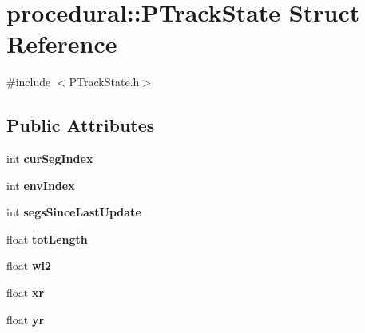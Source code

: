 \hypertarget{structprocedural_1_1_p_track_state}{\section{procedural\-:\-:P\-Track\-State Struct Reference}
\label{structprocedural_1_1_p_track_state}
}


{\ttfamily \#include $<$P\-Track\-State.\-h$>$}

\subsection*{Public Attributes}
\begin{DoxyCompactItemize}
\item 
\hypertarget{structprocedural_1_1_p_track_state_a1d5b0ec68a5b3817b6bb336e043a9552}{int {\bfseries cur\-Seg\-Index}}\label{structprocedural_1_1_p_track_state_a1d5b0ec68a5b3817b6bb336e043a9552}

\item 
\hypertarget{structprocedural_1_1_p_track_state_a1abf6f79571beaf7af6b63be22a1b54f}{int {\bfseries env\-Index}}\label{structprocedural_1_1_p_track_state_a1abf6f79571beaf7af6b63be22a1b54f}

\item 
\hypertarget{structprocedural_1_1_p_track_state_a7700ade2f8029fe6b7a6fad5f471416a}{int {\bfseries segs\-Since\-Last\-Update}}\label{structprocedural_1_1_p_track_state_a7700ade2f8029fe6b7a6fad5f471416a}

\item 
\hypertarget{structprocedural_1_1_p_track_state_ac4000734bf61258d0dd0095aed425c8c}{float {\bfseries tot\-Length}}\label{structprocedural_1_1_p_track_state_ac4000734bf61258d0dd0095aed425c8c}

\item 
\hypertarget{structprocedural_1_1_p_track_state_a526c75637e674dea57bb17143d3f2f1c}{float {\bfseries wi2}}\label{structprocedural_1_1_p_track_state_a526c75637e674dea57bb17143d3f2f1c}

\item 
\hypertarget{structprocedural_1_1_p_track_state_a732369437d49f0539aa39adb0474ad96}{float {\bfseries xr}}\label{structprocedural_1_1_p_track_state_a732369437d49f0539aa39adb0474ad96}

\item 
\hypertarget{structprocedural_1_1_p_track_state_a3e379294e5e60a9b83b5c68c124b1975}{float {\bfseries yr}}\label{structprocedural_1_1_p_track_state_a3e379294e5e60a9b83b5c68c124b1975}


\end{DoxyCompactItemize}
